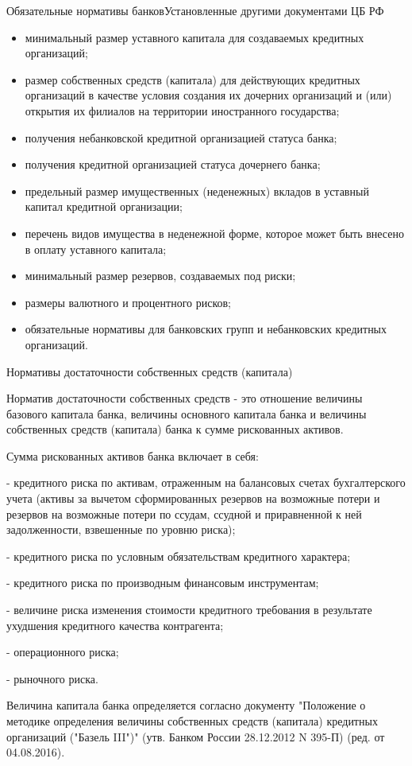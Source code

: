 \documentclass[_Banking_p2.tex]{subfiles}
\begin{document}
\begin{frame}[allowframebreaks]{Обязательные нормативы банков}{Установленные другими документами ЦБ РФ}
\begin{itemize}
\item
минимальный размер уставного капитала для создаваемых кредитных организаций; 
\item
размер собственных средств (капитала) для действующих кредитных организаций в качестве условия создания их дочерних организаций и (или) открытия их филиалов на территории иностранного государства;
\item
получения небанковской кредитной организацией статуса банка;
\pagebreak
\item
получения кредитной организацией статуса дочернего банка;
\item
предельный размер имущественных (неденежных) вкладов в уставный капитал кредитной организации;
\pagebreak
\item
перечень видов имущества в неденежной форме, которое может быть внесено в оплату уставного капитала; 
\item
минимальный размер резервов, создаваемых под риски; 
\item
\pagebreak
размеры валютного и процентного рисков; 
\item
обязательные нормативы для банковских групп и небанковских кредитных организаций.
\end{itemize}
\end{frame}

\begin{frame}[allowframebreaks]{Нормативы достаточности собственных средств (капитала)}
\begin{block}{Норматив достаточности собственных средств}
\quad
 - это отношение величины базового капитала банка, величины основного капитала банка и величины собственных средств (капитала) банка к сумме рискованных активов.
\end{block}
\pagebreak

Сумма рискованных активов банка включает в себя:

- кредитного риска по активам, отраженным на балансовых счетах бухгалтерского учета (активы за вычетом сформированных резервов на возможные потери и резервов на возможные потери по ссудам, ссудной и приравненной к ней задолженности, взвешенные по уровню риска);

- кредитного риска по условным обязательствам кредитного характера;

\pagebreak
- кредитного риска по производным финансовым инструментам;

- величине риска изменения стоимости кредитного требования в результате ухудшения кредитного качества контрагента;

- операционного риска;

- рыночного риска.

\pagebreak
Величина капитала банка определяется согласно документу "Положение о методике определения величины собственных средств (капитала) кредитных организаций ("Базель III")" (утв. Банком России 28.12.2012 N 395-П) (ред. от 04.08.2016).
\end{frame}
\end{document}
